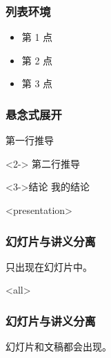 \documentclass{beamer}
\begin{document}
\begin{CJK}{UTF8}{hei}
    \begin{frame}
        \frametitle{列表环境}
        \begin{itemize}[<+->]
            \item 第 1 点
            \item 第 2 点
            \item 第 3 点
        \end{itemize}
    \end{frame}

    \begin{frame}
        \frametitle{悬念式展开}
        第一行推导

        \begin{actionenv}<2->
            第二行推导
        \end{actionenv}

        \begin{block}<3->{结论}
            我的结论
        \end{block}
    \end{frame}

    \begin{frame}<presentation>
        \frametitle{幻灯片与讲义分离}
        只出现在幻灯片中。
    \end{frame}

    \begin{frame}<all>
        \frametitle{幻灯片与讲义分离}
        幻灯片和文稿都会出现。

    \end{frame}

\end{CJK}
\end{document}
